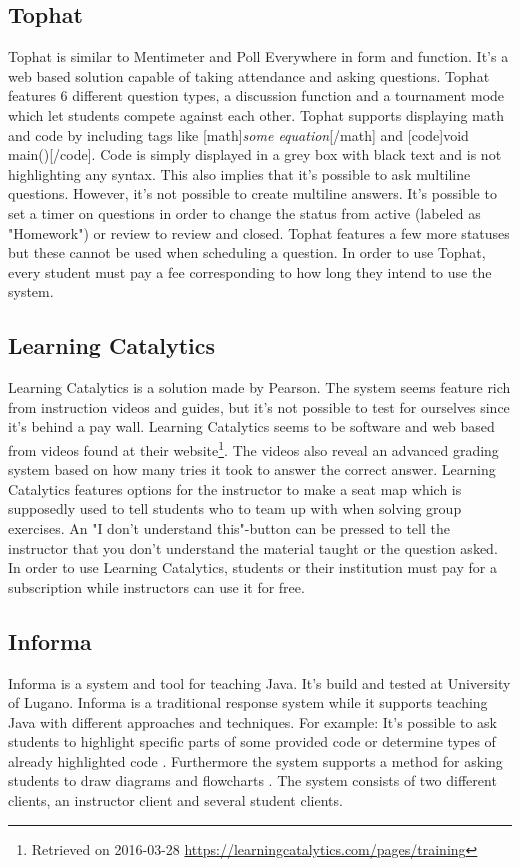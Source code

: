 \subsection*{Tophat}
Tophat is similar to Mentimeter and Poll Everywhere in form and function. It's a web based solution capable of taking attendance and asking questions. Tophat features 6 different question types, a discussion function and a tournament mode which let students compete against each other. Tophat supports displaying math and code by including tags like [math]\emph{some equation}[/math] and [code]void main()[/code]. Code is simply displayed in a grey box with black text and is not highlighting any syntax. This also implies that it's possible to ask multiline questions. However, it's not possible to create multiline answers. It's possible to set a timer on questions in order to change the status from active (labeled as "Homework") or review to review and closed. Tophat features a few more statuses but these cannot be used when scheduling a question. In order to use Tophat, every student must pay a fee corresponding to how long they intend to use the system.

\subsection*{Learning Catalytics}
Learning Catalytics is a solution made by Pearson. The system seems feature rich from instruction videos and guides, but it's not possible to test for ourselves since it's behind a pay wall. Learning Catalytics seems to be software and web based from videos found at their website\footnote{Retrieved on 2016-03-28 \url{https://learningcatalytics.com/pages/training}}. The videos also reveal an advanced grading system based on how many tries it took to answer the correct answer. Learning Catalytics features options for the instructor to make a seat map which is supposedly used to tell students who to team up with when solving group exercises. An "I don't understand this"-button can be pressed to tell the instructor that you don't understand the material taught or the question asked. In order to use Learning Catalytics, students or their institution must pay for a subscription while instructors can use it for free.

\subsection*{Informa}
Informa is a system and tool for teaching Java. It's build and tested at University of Lugano. Informa is a traditional response system while it supports teaching Java with different approaches and techniques. For example: It's possible to ask students to highlight specific parts of some provided code or determine types of already highlighted code \cite[p.~2]{Hauswirth09}. Furthermore the system supports a method for asking students to draw diagrams and flowcharts \cite[p.~3]{Hauswirth09}. 
The system consists of two different clients, an instructor client and several student clients.

